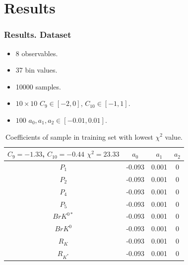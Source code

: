 \documentclass{beamer}
\begin{document}

\section{Results}





\begin{frame}
\frametitle{Results. Dataset}
\begin{itemize}
	\item 8 observables.
	\item 37 bin values.
	\item 10000 samples. 
	\item \(10 \times 10\) \(C_9 \in [-2, 0] \),  \(C_{10} \in [-1, 1]. \)
	\item \(100\) \(a_0, a_1, a_2 \in [-0.01, 0.01]. \)
\end{itemize}
\begin{table}
	\begin{tabular}{ |c|c|c|c|  } 
		\hline
		\small
		\(C_9 = -1.33\), \(C_{10} = -0.44\)  \(\chi^2 = 23.33 \)\normalsize
		& \textbf{\(a_0\)} & \textbf{\(a_1\)} & \textbf{\(a_2\)}\\
		\hline
		\(P_1\) & -0.093  & 0.001 &  0 \\
		\hline
		\(P_2\) & -0.093  & 0.001 &  0 \\
		\hline
		\(P_4\) & -0.093  & 0.001 &  0 \\
		\hline
		\(P_5\) & -0.093  & 0.001 &  0 \\		
		\hline
		\(BrK^{0*}\) & -0.093  & 0.001 &  0 \\	
		\hline
		\(BrK^{0}\) & -0.093  & 0.001 &  0 \\		
		\hline	
		\(R_{K}\) & -0.093  & 0.001 &  0 \\
		\hline	
		\(R_{K^*}\) & -0.093  & 0.001 &  0 \\	
		\hline
	\end{tabular}
	\caption{\label{tab:GANExp3BestSample} Coefficients of sample in training set with lowest \(\chi^2 \) value.}
\end{table}
\end{frame}
\end{document}
